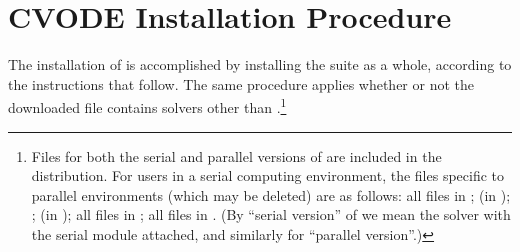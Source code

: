 \chapter{CVODE Installation Procedure}\label{s:install}

The installation of {\cvode} is accomplished by installing the
{\sundials} suite as a whole, according to the instructions that
follow.   The same procedure applies whether or not the downloaded
file contains solvers other than {\cvode}.\footnote{Files for both the
serial and parallel versions of {\cvode} are included in the distribution.
For users in a serial computing environment, the files specific to parallel
environments (which may be deleted) are as follows:
all files in ;
 (in );
; 
 (in );
all files in ;
all files in .
(By ``serial version'' of {\cvode} we mean the {\cvode} solver with the
serial {\nvector} module attached, and similarly for ``parallel version''.)}




